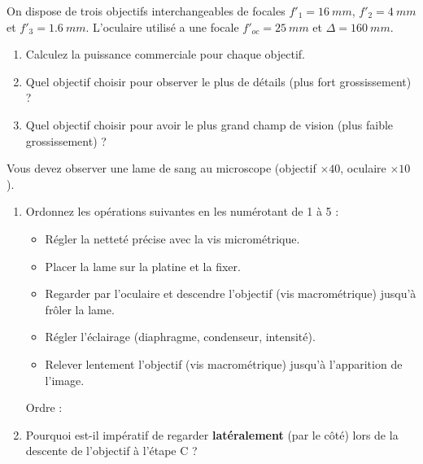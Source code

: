 \documentclass[11pt]{article}
\begin{document}
\begin{exercice}
\label{exo:choix}
On dispose de trois objectifs interchangeables de focales $f'_1 = \SI{16}{mm}$, $f'_2 = \SI{4}{mm}$ et $f'_3 = \SI{1,6}{mm}$. L'oculaire utilisé a une focale $f'_{oc} = \SI{25}{mm}$ et $\Delta = \SI{160}{mm}$.
\begin{enumerate}
\item Calculez la puissance commerciale pour chaque objectif.
\item Quel objectif choisir pour observer le plus de détails (plus fort grossissement) ?
\item Quel objectif choisir pour avoir le plus grand champ de vision (plus faible grossissement) ?
\end{enumerate}
\end{exercice}

\begin{exercice}
\label{exo:manip}
Vous devez observer une lame de sang au microscope (objectif $\times 40$, oculaire $\times 10$).
\begin{enumerate}
\item Ordonnez les opérations suivantes en les numérotant de 1 à 5 :
\begin{itemize}
    \item[A] Régler la netteté précise avec la vis micrométrique.
    \item[B] Placer la lame sur la platine et la fixer.
    \item[C] Regarder par l'oculaire et descendre l'objectif (vis macrométrique) jusqu'à frôler la lame.
    \item[D] Régler l'éclairage (diaphragme, condenseur, intensité).
    \item[E] Relever lentement l'objectif (vis macrométrique) jusqu'à l'apparition de l'image.
\end{itemize}
Ordre : \dotfill
\item Pourquoi est-il impératif de regarder \textbf{latéralement} (par le côté) lors de la descente de l'objectif à l'étape C ?
\dotfill
\end{enumerate}
\end{exercice}
\end{document}
